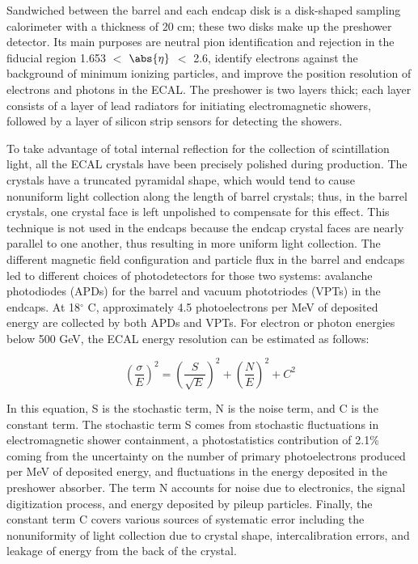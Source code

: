 Sandwiched between the barrel and each endcap disk is a disk-shaped sampling calorimeter with a thickness of 20 cm; these two disks make up the preshower detector. Its main purposes are neutral pion identification and rejection in the fiducial region 1.653 $<$ $\abs{\eta}$ $<$ 2.6, identify electrons against the background of minimum ionizing particles, and improve the position resolution of electrons and photons in the ECAL. The preshower is two layers thick; each layer consists of a layer of lead radiators for initiating electromagnetic showers, followed by a layer of silicon strip sensors for detecting the showers.

To take advantage of total internal reflection for the collection of scintillation light, all the ECAL crystals have been precisely polished during production. The crystals have a truncated pyramidal shape, which would tend to cause nonuniform light collection along the length of barrel crystals; thus, in the barrel crystals, one crystal face is left unpolished to compensate for this effect. This technique is not used in the endcaps because the endcap crystal faces are nearly parallel to one another, thus resulting in more uniform light collection. The different magnetic field configuration and particle flux in the barrel and endcaps led to different choices of photodetectors for those two systems: avalanche photodiodes (APDs) for the barrel and vacuum phototriodes (VPTs) in the endcaps. At 18$^{\circ}$ C, approximately 4.5 photoelectrons per MeV of deposited energy are collected by both APDs and VPTs. For electron or photon energies below 500 GeV, the ECAL energy resolution can be estimated as follows:

\begin{equation}
(\frac{\sigma}{E})^2 = (\frac{S}{\sqrt{E}})^2 + (\frac{N}{E})^2 + C^2
\end{equation}

In this equation, S is the stochastic term, N is the noise term, and C is the constant term. The stochastic term S comes from stochastic fluctuations in electromagnetic shower containment, a photostatistics contribution of 2.1\% coming from the uncertainty on the number of primary photoelectrons produced per MeV of deposited energy, and fluctuations in the energy deposited in the preshower absorber. The term N accounts for noise due to electronics, the signal digitization process, and energy deposited by pileup particles. Finally, the constant term C covers various sources of systematic error including the nonuniformity of light collection due to crystal shape, intercalibration errors, and leakage of energy from the back of the crystal.

